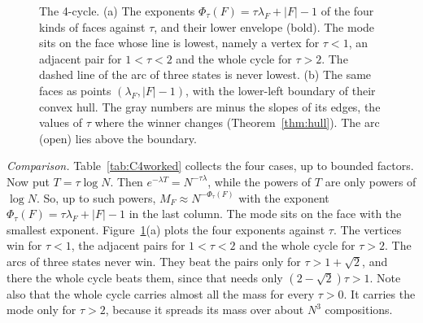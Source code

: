\begin{figure}[t]
\centering
{}
\caption{The 4-cycle. (a) The exponents $\Phi_\tau(F)=\tau\lambda_F+\lvert
F\rvert-1$ of the four kinds of faces against $\tau$, and their lower envelope
(bold). The mode sits on the face whose line is lowest, namely a vertex for
$\tau<1$, an adjacent pair for $1<\tau<2$ and the whole cycle for $\tau>2$. The
dashed line of the arc of three states is never lowest. (b) The same faces as points
$(\lambda_F,\lvert F\rvert-1)$, with the lower-left boundary of their convex
hull. The gray numbers are minus the slopes of its edges, the values of $\tau$
where the winner changes (Theorem~\ref{thm:hull}). The arc (open) lies above
the boundary.}
\label{fig:C4worked}
\end{figure}

\emph{Comparison.} Table~\ref{tab:C4worked} collects the four cases, up to
bounded factors. Now put $T=\tau\log N$. Then $e^{-\lambda T}=N^{-\tau\lambda}$, while
the powers of $T$ are only powers of $\log N$. So, up to such powers,
$M_F\approx N^{-\Phi_\tau(F)}$ with the exponent
$\Phi_\tau(F)=\tau\lambda_F+\lvert F\rvert-1$ in the last column. The mode sits
on the face with the smallest exponent. Figure~\ref{fig:C4worked}(a) plots the
four exponents against $\tau$. The vertices win for $\tau<1$, the adjacent
pairs for $1<\tau<2$ and the whole cycle for $\tau>2$. The arcs of three
states never win. They beat the pairs only for $\tau>1+\sqrt2$, and there the
whole cycle beats them, since that needs only $(2-\sqrt2)\tau>1$. Note also
that the whole cycle carries almost all the mass for every $\tau>0$. It
carries the mode only for $\tau>2$, because it spreads its mass over about
$N^3$ compositions.

